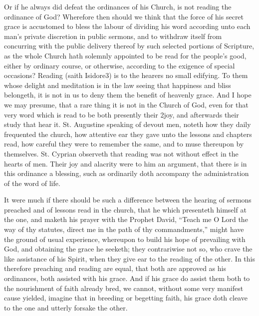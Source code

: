 Or if he always did defeat the ordinances of his Church, is not reading the ordinance of God? Wherefore then should we think that the force of his secret grace is accustomed to bless the labour of dividing his word according unto each man’s private discretion in public sermons, and to withdraw itself from concurring with the public delivery thereof by such selected portions of Scripture, as the whole Church hath solemnly appointed to be read for the people’s good, either by ordinary course, or otherwise, according to the exigence of special occasions? Reading (saith Isidore3) is to the hearers no small edifying. To them whose delight and meditation is  in the law seeing that happiness and bliss belongeth, it is not in us to deny them the benefit of heavenly grace. And I hope we may presume, that a rare thing it is not in the Church of God, even for that very word which is read to be both presently their 2joy, and afterwards their study that hear it. St. Augustine speaking of devout men, noteth how they daily frequented the church, how attentive ear they gave unto the lessons and chapters read, how careful they were to remember the same, and to muse thereupon by themselves. St. Cyprian observeth that reading was not without effect in the hearts of men. Their joy and alacrity were to him an argument, that there is in this ordinance a blessing, such as ordinarily doth accompany the administration of the word of life.

It were much if there should be such a difference between the hearing of sermons preached and of lessons read in the church, that he which presenteth himself at the one, and maketh his prayer with the Prophet David, “Teach me O Lord the way of thy statutes, direct me in the path of thy commandments,” might have the ground of usual experience, whereupon to build his hope of prevailing with God, and obtaining the grace he seeketh; they contrariwise not so, who crave the like assistance of his Spirit, when they give ear to the reading of the other. In this therefore preaching and reading are equal, that both are approved as his ordinances, both assisted with his grace. And if his grace do assist them both to the nourishment of faith already bred, we cannot, without some very manifest cause yielded, imagine that in breeding or begetting faith, his grace doth cleave to the one and utterly forsake the other.




